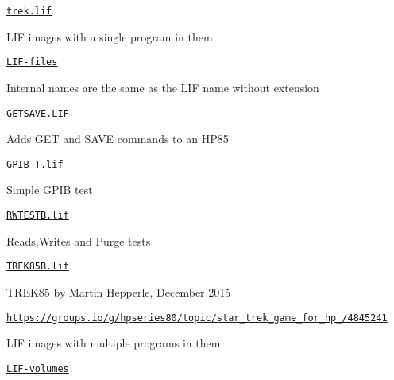 \begin{DoxyItemize}
\begin{DoxyItemize}
\begin{DoxyItemize}
\begin{DoxyItemize}
\begin{DoxyItemize}
\begin{DoxyItemize}
\item \href{sdcard/TREK85/trek.lif}{\tt trek.\+lif}
\end{DoxyItemize}
\end{DoxyItemize}
\end{DoxyItemize}
\item L\+IF images with a single program in them
\begin{DoxyItemize}
\item \href{sdcard/LIF-files}{\tt L\+I\+F-\/files}
\begin{DoxyItemize}
\item Internal names are the same as the L\+IF name without extension
\end{DoxyItemize}
\item \href{sdcard/ASCII-files/GETSAVE.LIF}{\tt G\+E\+T\+S\+A\+V\+E.\+L\+IF}
\begin{DoxyItemize}
\item Adds G\+ET and S\+A\+VE commands to an H\+P85
\end{DoxyItemize}
\item \href{sdcard/ASCII-files/GPIB-T.lif}{\tt G\+P\+I\+B-\/\+T.\+lif}
\begin{DoxyItemize}
\item Simple G\+P\+IB test
\end{DoxyItemize}
\item \href{sdcard/ASCII-files/RWTESTB.lif}{\tt R\+W\+T\+E\+S\+T\+B.\+lif}
\begin{DoxyItemize}
\item Reads,Writes and Purge tests
\end{DoxyItemize}
\item \href{sdcard/ASCII-files/TREK85B.lif}{\tt T\+R\+E\+K85\+B.\+lif}
\begin{DoxyItemize}
\item T\+R\+E\+K85 by Martin Hepperle, December 2015
\begin{DoxyItemize}
\item \href{https://groups.io/g/hpseries80/topic/star_trek_game_for_hp_85/4845241}{\tt https\+://groups.\+io/g/hpseries80/topic/star\+\_\+trek\+\_\+game\+\_\+for\+\_\+hp\+\_/4845241}
\end{DoxyItemize}
\end{DoxyItemize}
\end{DoxyItemize}
\item L\+IF images with multiple programs in them
\begin{DoxyItemize}
\item \href{sdcard/LIF-volumes}{\tt L\+I\+F-\/volumes}

\end{DoxyItemize}
\end{DoxyItemize}
\end{DoxyItemize}
\end{DoxyItemize}
